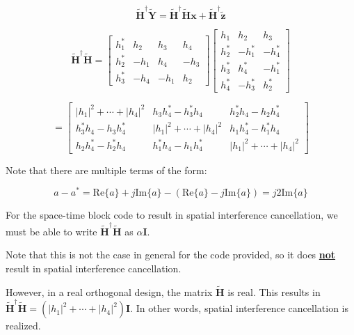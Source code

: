 \documentclass[fleqn]{article}
\begin{document}
\begin{enumerate}
\begin{enumerate}
			\begin{equation*}
				\mathbf{\tilde{H}^\dagger\tilde{Y}} = \mathbf{\tilde{H}^\dagger\tilde{H}x} + \mathbf{\tilde{H}^\dagger\tilde{z}}
			\end{equation*}
			
			\begin{equation*}
				\mathbf{\tilde{H}^\dagger\tilde{H}} = \begin{bmatrix}
					h_1^* &  h_2 &  h_3 &  h_4 \\
					h_2^* & -h_1 &  h_4 & -h_3 \\
					h_3^* & -h_4 & -h_1 &  h_2
				\end{bmatrix} \begin{bmatrix}
					h_1   &  h_2   &  h_3 \\
				    h_2^* & -h_1^* & -h_4^* \\
					h_3^* &  h_4^* & -h_1^* \\
					h_4^* & -h_3^* &  h_2^*
				\end{bmatrix}
			\end{equation*}
			
			\begin{equation*}
				= \begin{bmatrix}
					|h_1|^2 + \cdots + |h_4|^2 & h_3h_4^* - h_3^*h_4 & h_2^*h_4 - h_2h_4^* \\
					h_3^*h_4 - h_3h_4^* & |h_1|^2 + \cdots + |h_4|^2 & h_1h_4^* - h_1^*h_4 \\
					h_2h_4^* - h_2^*h_4 & h_1^*h_4 - h_1h_4^* & |h_1|^2 + \cdots + |h_4|^2
				\end{bmatrix}
			\end{equation*}
			
			Note that there are multiple terms of the form:
			
			\begin{equation*}
				a - a^* = \text{Re}\{a\} + j\text{Im}\{a\} - (\text{Re}\{a\} - j\text{Im}\{a\}) = j2\text{Im}\{a\}
			\end{equation*}
			
			For the space-time block code to result in spatial interference cancellation, we must be able to write $\mathbf{\tilde{H}^{\dagger}\tilde{H}}$ as $\alpha\mathbf{I}$.
			
			Note that this is not the case in general for the code provided, so it does \textbf{\underline{not}} result in spatial interference cancellation.
			
			However, in a real orthogonal design, the matrix $\mathbf{\tilde{H}}$ is real. This results in $\mathbf{\tilde{H}^\dagger\tilde{H}} = (|h_1|^2 + \cdots + |h_4|^2)\mathbf{I}$. In other words, spatial interference cancellation is realized.
			

\end{enumerate}
\end{enumerate}
\end{document}
